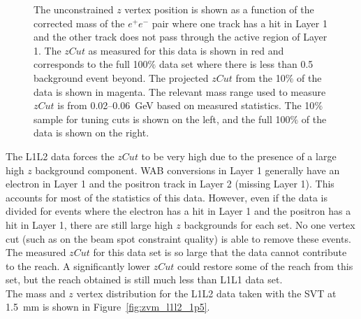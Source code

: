 \begin{figure}[hbt]
\begin{minipage}{0.5\textwidth}
 \end{minipage}
  \caption[$z$ vertex and mass distribution for the L1L2 data set with the SVT at $\pm0.5$~mm]{The unconstrained $z$ vertex position is shown as a function of the corrected mass
of the $e^+e^-$ pair where one track has a hit in Layer 1 and the other track does not pass through the active region of Layer 1. The $zCut$ as measured for this data is shown in red
and corresponds to the full 100$\%$ data set where there is less than 0.5 background event beyond. The projected $zCut$ from the 10$\%$ of the data is shown in magenta. The relevant mass range used to measure $zCut$ is from 0.02--0.06~GeV based on measured statistics. The 10$\%$ sample for tuning cuts is shown on the left, and the full 100$\%$ of the data is shown on the right.}
  \label{fig:zvm_l1l2}
\end{figure}
The L1L2 data forces the $zCut$ to be very high due to the presence of a large high $z$ background component. WAB conversions in Layer 1 generally have an electron in Layer 1 and the positron track in Layer 2 (missing Layer 1). This accounts for most of the statistics of this data. However, even if the data is divided for events where the electron has a hit in Layer 1 and the positron has a hit in Layer 1, there are still large high $z$ backgrounds for each set. No one vertex cut (such as on the beam spot constraint quality) is able to remove these events. The measured $zCut$ for this data set is so large that the data cannot contribute to the reach. A significantly lower $zCut$ could restore some of the reach from this set, but the reach obtained is still much less than L1L1 data set. \\
\indent The mass and $z$ vertex distribution for the L1L2 data taken with the SVT at 1.5~mm is shown in Figure~\ref{fig:zvm_l1l2_1p5}.
